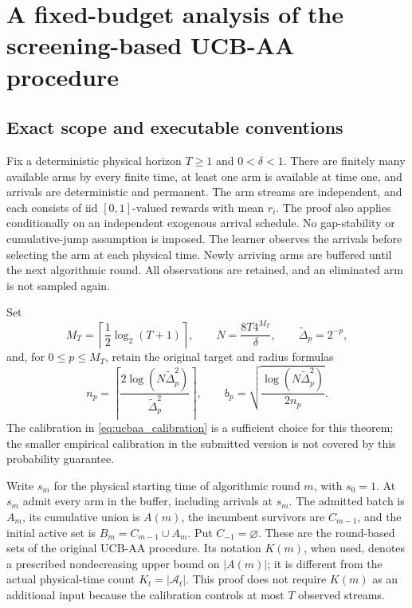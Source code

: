 \section{A fixed-budget analysis of the screening-based UCB-AA procedure}
\label{app:ucbaa_repaired}

\subsection{Exact scope and executable conventions}

Fix a deterministic physical horizon $T\ge1$ and $0<\delta<1$.
There are finitely many available arms by every finite time, at least one arm
is available at time one, and arrivals are deterministic and permanent.
The arm streams are independent, and each consists of iid $[0,1]$-valued
rewards with mean $r_i$. The proof also applies conditionally on an independent exogenous
arrival schedule. No gap-stability or cumulative-jump assumption is imposed.
The learner observes the arrivals before selecting the arm at each physical
time. Newly arriving arms are buffered until the next algorithmic round.
All observations are retained, and an eliminated arm is not sampled again.

Set
\begin{equation}
 M_T=\left\lceil\frac12\log_2(T+1)\right\rceil,\qquad
 N=\frac{8T4^{M_T}}{\delta},\qquad \widetilde\Delta_p=2^{-p},
 \label{eq:ucbaa_calibration}
\end{equation}
and, for $0\le p\le M_T$, retain the original target and radius formulas
\begin{equation}
 n_p=\left\lceil
       \frac{2\log(N\widetilde\Delta_p^2)}{\widetilde\Delta_p^2}
       \right\rceil,\qquad
 b_p=\sqrt{\frac{\log(N\widetilde\Delta_p^2)}{2n_p}}.
 \label{eq:ucbaa_targets}
\end{equation}
The calibration in \eqref{eq:ucbaa_calibration} is a sufficient choice for
this theorem; the smaller empirical calibration in the submitted version
is not covered by this probability guarantee.

Write $s_m$ for the physical starting time of algorithmic round $m$, with
$s_0=1$. At $s_m$ admit every arm in the buffer, including arrivals at $s_m$.
The admitted batch is $A_m$, its cumulative union is $A(m)$, the incumbent
survivors are $C_{m-1}$, and the initial active set is
$B_m=C_{m-1}\cup A_m$. Put $C_{-1}=\varnothing$.
These are the round-based sets of the original UCB-AA procedure. Its
notation $K(m)$, when used, denotes a prescribed nondecreasing upper
bound on $|A(m)|$; it is different from the actual physical-time count
$K_t=|\mathcal A_t|$. This proof does not require $K(m)$ as an additional
input because the calibration controls at most $T$ observed streams.

